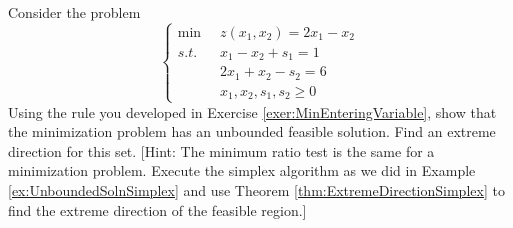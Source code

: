 \begin{exercise} Consider the problem 
\begin{displaymath}
\left\{
\begin{aligned}
\min\;\;& z(x_1,x_2) = 2x_1 - x_2\\
s.t.\;\;& x_1 - x_2 + s_1 = 1\\
& 2x_1 + x_2 - s_2 = 6\\
&x_1,x_2,s_1,s_2 \geq 0
\end{aligned}
\right.
\end{displaymath}
Using the rule you developed in Exercise \ref{exer:MinEnteringVariable}, show that the minimization problem has an unbounded feasible solution. Find an extreme direction for this set.
[Hint: The minimum ratio test is the same for a minimization problem. Execute the simplex algorithm as we did in Example \ref{ex:UnboundedSolnSimplex} and use Theorem \ref{thm:ExtremeDirectionSimplex} to find the extreme direction of the feasible region.]
\label{exer:UnboundedMin}
\end{exercise}

